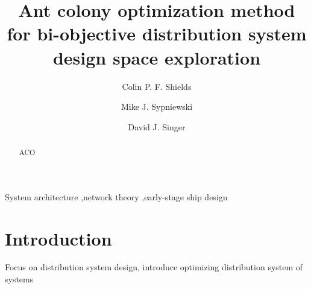 \documentclass[preprint,12pt]{elsarticle}
\begin{document}
\begin{frontmatter}



\title{Ant colony optimization method for bi-objective distribution system design space exploration}


\author[1]{Colin P. F. Shields}
\author[1]{Mike J. Sypniewski} 
\author[1]{David J. Singer} 
\address[1]{University of Michigan, United States}

\begin{abstract}
ACO

\end{abstract}

\begin{keyword}


System architecture \sep network theory \sep early-stage ship design

\end{keyword}

\end{frontmatter}


\section{Introduction} \label{sec:intro}
Focus on distribution system design, introduce optimizing distribution system of systems
\end{document}
